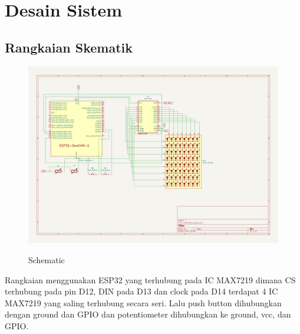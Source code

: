 \documentclass[a4paper,12pt]{article}
\begin{document}
\section{Desain Sistem}
\subsection{Rangkaian Skematik}
\begin{figure}[H]
    \centering
    \includegraphics[width=1\textwidth]{images/schematic.png}
    \label{fig:schematic}
    \caption{Schematic}
\end{figure}
Rangkaian menggunakan ESP32 yang terhubung pada IC MAX7219 dimana CS
terhubung pada pin D12, DIN pada D13 dan clock pada D14
terdapat 4 IC MAX7219 yang saling terhubung secara seri. Lalu push button dihubungkan dengan
ground dan GPIO dan potentiometer dihubungkan ke ground, vcc, dan GPIO.
\end{document}
